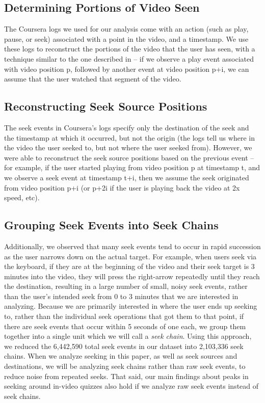 \documentclass{sigchi}
\begin{document}
\subsection{Determining Portions of Video Seen}

The Coursera logs we used for our analysis come with an action (such as play, pause, or seek) associated with a point in the video, and a timestamp. We use these logs to reconstruct the portions of the video that the user has seen, with a technique similar to the one described in \cite{juho} -- if we observe a play event associated with video position p, followed by another event at video position p+i, we can assume that the user watched that segment of the video.

\subsection{Reconstructing Seek Source Positions}

The seek events in Coursera's logs specify only the destination of the seek and the timestamp at which it occurred, but not the origin (the logs tell us where in the video the user seeked to, but not where the user seeked from). However, we were able to reconstruct the seek source positions based on the previous event -- for example, if the user started playing from video position p at timestamp t, and we observe a seek event at timestamp t+i, then we assume the seek originated from video position p+i (or p+2i if the user is playing back the video at 2x speed, etc).

\subsection{Grouping Seek Events into Seek Chains}

Additionally, we observed that many seek events tend to occur in rapid succession as the user narrows down on the actual target. For example, when users seek via the keyboard, if they are at the beginning of the video and their seek target is 3 minutes into the video, they will press the right-arrow repeatedly until they reach the destination, resulting in a large number of small, noisy seek events, rather than the user's intended seek from 0 to 3 minutes that we are interested in analyzing. Because we are primarily interested in where the user ends up seeking to, rather than the individual seek operations that got them to that point, if there are seek events that occur within 5 seconds of one each, we group them together into a single unit which we will call a \textit{seek chain}. Using this approach, we reduced the 6,442,590 total seek events in our dataset into 2,103,336 seek chains. When we analyze seeking in this paper, as well as seek sources and destinations, we will be analyzing seek chains rather than raw seek events, to reduce noise from repeated seeks. That said, our main findings about peaks in seeking around in-video quizzes also hold if we analyze raw seek events instead of seek chains.
\end{document}
